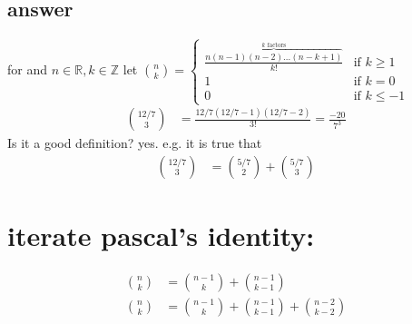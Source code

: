 \documentclass{article}
\begin{document}
\subsection*{answer}
for and $n\in\mathbb{R},k\in\mathbb{Z}$ let $\binom{n}{k}=\begin{cases}\frac{\overbrace{n(n-1)(n-2)\dots(n-k+1)}^{k \text{ factors}}}{k!}&\text{if } k\ge1\\1&\text{if }k=0\\0&\text{if }k\le-1\end{cases}$
\begin{align*}
  \binom{12/7}{3}&=\frac{12/7(12/7-1)(12/7-2)}{3!}=\frac{-20}{7^3}
\end{align*}
Is it a good definition? yes. e.g. it is true that
\begin{align*}
  \binom{12/7}{3}&=\binom{5/7}{2}+\binom{5/7}{3}
\end{align*}
\section*{iterate pascal's identity:}
\begin{align*}
  \binom{n}{k}&=\binom{n-1}{k}+\binom{n-1}{k-1}\\
  \binom{n}{k}&=\binom{n-1}{k}+\binom{n-1}{k-1}+\binom{n-2}{k-2}\\
\end{align*}
\end{document}

